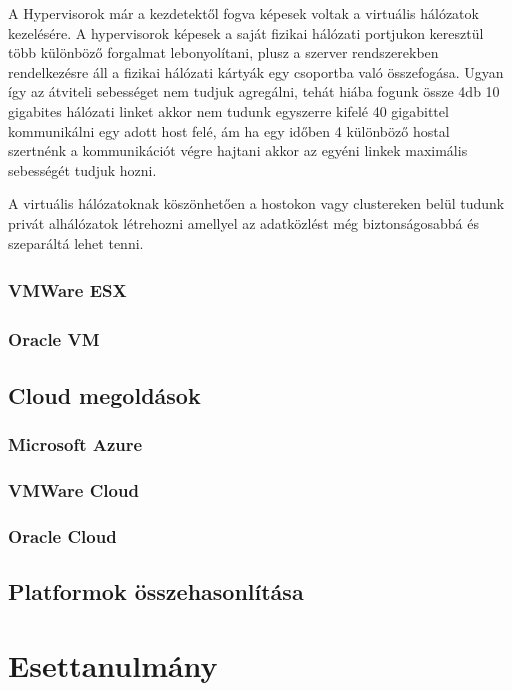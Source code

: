\documentclass[12pt,oneside,justify]{book}
\begin{document}
A Hypervisorok már a kezdetektől fogva képesek voltak a virtuális hálózatok kezelésére. A hypervisorok képesek a saját fizikai hálózati portjukon keresztül több különböző forgalmat lebonyolítani, plusz a szerver rendszerekben rendelkezésre áll a fizikai hálózati kártyák egy csoportba való összefogása. Ugyan így az átviteli sebességet nem tudjuk agregálni, tehát hiába fogunk össze 4db 10 gigabites hálózati linket akkor nem tudunk egyszerre kifelé 40 gigabittel kommunikálni egy adott host felé, ám ha egy időben 4 különböző hostal szertnénk a kommunikációt végre hajtani akkor az egyéni linkek maximális sebességét tudjuk hozni. 

A virtuális hálózatoknak köszönhetően a hostokon vagy clustereken belül tudunk privát alhálózatok létrehozni amellyel az adatközlést még biztonságosabbá és szeparáltá lehet tenni.

\subsection{VMWare ESX \textsuperscript{\textregistered}}


\subsection{Oracle\textsuperscript{\textregistered} VM}


\section{Cloud megoldások}
\subsection{Microsoft Azure}


\subsection{VMWare Cloud}


\subsection{Oracle Cloud}


\section{Platformok összehasonlítása}


\chapter{Esettanulmány}
\end{document}
